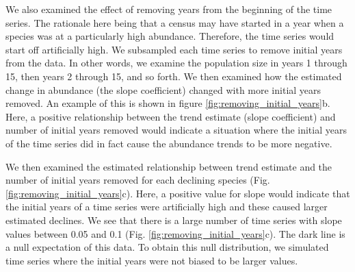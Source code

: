 \documentclass[]{article}
\begin{document}
We also examined the effect of removing years from the beginning of the
time series. The rationale here being that a census may have started in
a year when a species was at a particularly high abundance. Therefore,
the time series would start off artificially high. We subsampled each
time series to remove initial years from the data. In other words, we
examine the population size in years 1 through 15, then years 2 through
15, and so forth. We then examined how the estimated change in abundance
(the slope coefficient) changed with more initial years removed. An
example of this is shown in figure \ref{fig:removing_initial_years}b.
Here, a positive relationship between the trend estimate (slope
coefficient) and number of initial years removed would indicate a
situation where the initial years of the time series did in fact cause
the abundance trends to be more negative.

We then examined the estimated relationship between trend estimate and
the number of initial years removed for each declining species (Fig.
\ref{fig:removing_initial_years}c). Here, a positive value for slope
would indicate that the initial years of a time series were artificially
high and these caused larger estimated declines. We see that there is a
large number of time series with slope values between 0.05 and 0.1 (Fig.
\ref{fig:removing_initial_years}c). The dark line is a null expectation
of this data. To obtain this null distribution, we simulated time series
where the initial years were not biased to be larger values.
\end{document}
